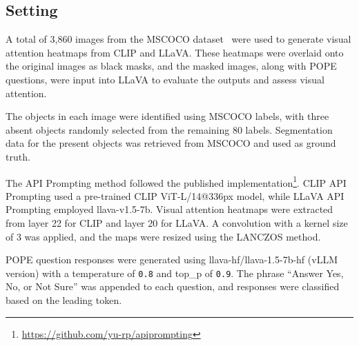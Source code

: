 \subsection{Setting}
A total of 3,860 images from the MSCOCO dataset~\cite{mscoco} were used to generate visual attention heatmaps from CLIP and LLaVA. These heatmaps were overlaid onto the original images as black masks, and the masked images, along with POPE questions, were input into LLaVA to evaluate the outputs and assess visual attention.

The objects in each image were identified using MSCOCO labels, with three absent objects randomly selected from the remaining 80 labels. Segmentation data for the present objects was retrieved from MSCOCO and used as ground truth.

The API Prompting method followed the published implementation\footnote{\url{https://github.com/yu-rp/apiprompting}}.
CLIP API Prompting used a pre-trained CLIP ViT-L/14@336px model, while LLaVA API Prompting employed llava-v1.5-7b. Visual attention heatmaps were extracted from layer 22 for CLIP and layer 20 for LLaVA. A convolution with a kernel size of 3 was applied, and the maps were resized using the LANCZOS method.

POPE question responses were generated using llava-hf/llava-1.5-7b-hf (vLLM version) with a temperature of \texttt{0.8} and top\_p of \texttt{0.9}. The phrase “Answer Yes, No, or Not Sure” was appended to each question, and responses were classified based on the leading token.




